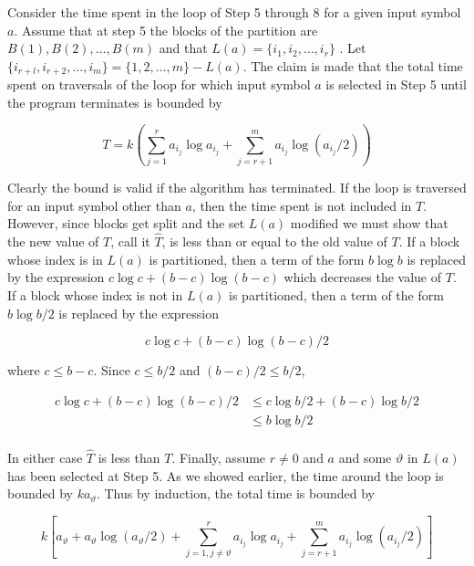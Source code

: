 Consider the time spent in the loop of Step 5 through 8 for a given input symbol $a$. Assume that at
step 5 the blocks of the partition are $B(1), B(2), \ldots, B(m)$ and that $L(a) = \{ i_1, i_2, \ldots, i_r \}$ . Let
$\{ i_{r+l}, i_{r+2}, \ldots, i_m \} = \{1, 2, \ldots, m\} - L(a)$. The claim is made
that the total time spent on traversals of the
loop for which input symbol $a$ is selected in Step 5 until the program terminates is bounded by

\begin{displaymath}
T = k(\sum_{j=1}^{r} a_{i_j} \log a_{i_j} + \sum_{j=r+1}^{m} a_{i_j} \log (a_{i_j} / 2))
\end{displaymath}

Clearly the bound is valid if the algorithm has terminated. If the loop is traversed for an input symbol
other than $a$, then the time spent is not included in $T$. However, since blocks get split and the set
$L(a)$ modified we must show that the new value of $T$, call it $\hat{T}$, is less than or equal to the old value
of $T$. If a block whose index is in $L(a)$ is partitioned, then a term of the form $b \log b$ is replaced by
the expression $c \log c + (b - c) \log (b - c)$ which decreases the value of $T$. If a block whose index is not
in $L(a)$ is partitioned, then a term of the form $b \log b/2$ is replaced by the expression

\begin{displaymath}
c \log c + (b - c) \log (b - c) / 2
\end{displaymath}

where $c \leq b-c$. Since $c \leq b/2$ and $(b - c)/2 \leq b/2$,

\begin{displaymath}
\begin{array}{rl}
c \log c + (b - c) \log (b - c) / 2   &   \leq  c \log b/2 + (b - c) \log b/2  \\
                                      &   \leq  b \log b/2                     \\
\end{array}
\end{displaymath}

In either case $\hat{T}$ is less than $T$. Finally, assume $r \neq 0$ and $a$ and some $\vartheta$ in $L(a)$ has been
selected at Step 5. As we showed earlier, the time around the loop is bounded by $ka_{\vartheta}$. Thus by induction,
the total time is bounded by

\begin{displaymath}
k[a_{\vartheta} + a_{\vartheta} \log (a_{\vartheta} / 2) + \sum_{j=1, j \neq \vartheta}^{r} a_{i_j} \log a_{i_j} + \sum_{j=r+1}^{m} a_{i_j} \log (a_{i_j} / 2)]
\end{displaymath}

